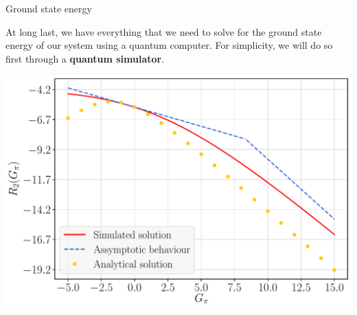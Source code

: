 \documentclass[9pt, handout, aspectratio=169]{beamer}	%
\begin{document}
\begin{frame}[allowframebreaks]{Ground state energy}

	At long last, we have everything that we need to solve for the ground state energy of our system using a quantum computer. For simplicity, we will do so first through a \textbf{quantum simulator}.

	\begin{center}
		\includegraphics[width=.45\paperwidth]{Figures/NJL1-model-solving/G2}
	\end{center}
	\vspace{-2em}

\break


\end{frame}
\end{document}
